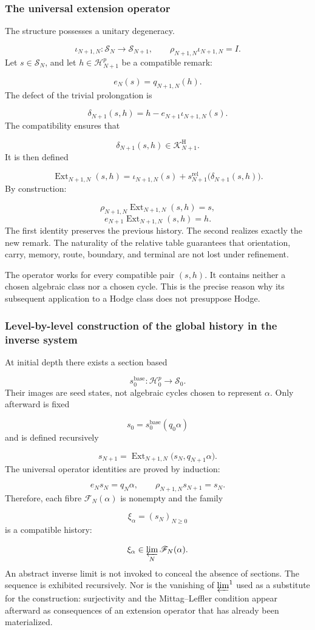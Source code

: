 \subsubsection{The universal extension operator}
The structure possesses a unitary degeneracy.\par
\[
\iota_{N+1,N}:\mathscr S_N\longrightarrow\mathscr S_{N+1},
\qquad
\rho_{N+1,N}\iota_{N+1,N}=I.
\]
Let \(s\in\mathscr S_N\), and let \(h\in\mathscr H_{N+1}^p\) be a compatible remark:\par
\[
e_N(s)=q_{N+1,N}(h).
\]
The defect of the trivial prolongation is\par
\[
\delta_{N+1}(s,h)
=
h-e_{N+1}\iota_{N+1,N}(s).
\]
The compatibility ensures that\par
\[
\delta_{N+1}(s,h)
\in
\mathscr K_{N+1}^{\mathrm H}.
\]
It is then defined\par
\[
\operatorname{Ext}_{N+1,N}(s,h)
=
\iota_{N+1,N}(s)
+
s_{N+1}^{\mathrm{rel}}
\bigl(\delta_{N+1}(s,h)\bigr).
\]
By construction:\par
\[
\rho_{N+1,N}
\operatorname{Ext}_{N+1,N}(s,h)
=s,
\]
\[
e_{N+1}
\operatorname{Ext}_{N+1,N}(s,h)
=h.
\]
The first identity preserves the previous history. The second realizes exactly the new remark. The naturality of the relative table guarantees that orientation, carry, memory, route, boundary, and terminal are not lost under refinement.\par
The operator works for every compatible pair \((s,h)\). It contains neither a chosen algebraic class nor a chosen cycle. This is the precise reason why its subsequent application to a Hodge class does not presuppose Hodge.\par
{}
\subsubsection{Level-by-level construction of the global history in the inverse system}
At initial depth there exists a section based\par
\[
s_0^{\mathrm{base}}:
\mathscr H_0^p\longrightarrow\mathscr S_0.
\]
Their images are seed states, not algebraic cycles chosen to represent \(\alpha\). Only afterward is fixed\par
\[
s_0=s_0^{\mathrm{base}}(q_0\alpha)
\]
and is defined recursively\par
\[
s_{N+1}
=
\operatorname{Ext}_{N+1,N}
\bigl(s_N,q_{N+1}\alpha\bigr).
\]
The universal operator identities are proved by induction:\par
\[
e_Ns_N=q_N\alpha,
\qquad
\rho_{N+1,N}s_{N+1}=s_N.
\]
Therefore, each fibre \(\mathscr F_N(\alpha)\) is nonempty and the family\par
\[
\xi_\alpha=(s_N)_{N\ge0}
\]
is a compatible history:\par
\[
\xi_\alpha
\in
\varprojlim_N\mathscr F_N(\alpha).
\]
An abstract inverse limit is not invoked to conceal the absence of sections. The sequence is exhibited recursively. Nor is the vanishing of \(\varprojlim^1\) used as a substitute for the construction: surjectivity and the Mittag–Leffler condition appear afterward as consequences of an extension operator that has already been materialized.\par
{}
